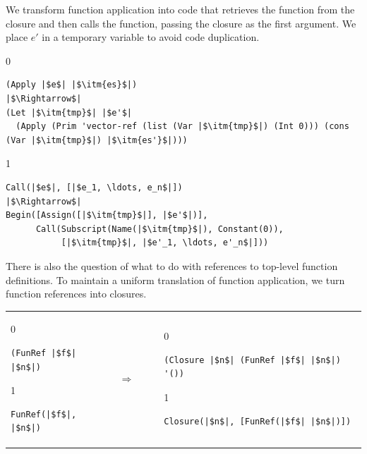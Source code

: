 \documentclass[7x10]{TimesAPriori_MIT}%
\def\racketEd{0}
\def\pythonEd{1}
\def\edition{1}
\newcommand{\pythonColor}[0]{}
\numberwithin{theorem}{chapter}
\numberwithin{definition}{chapter}
\numberwithin{equation}{chapter}
\begin{document}
We transform function application into code that retrieves the
function from the closure and then calls the function, passing the
closure as the first argument. We place $e'$ in a temporary variable
to avoid code duplication.
\begin{center}
\begin{minipage}{\textwidth}
{\if\edition\racketEd
\begin{lstlisting}
(Apply |$e$| |$\itm{es}$|)
|$\Rightarrow$|
(Let |$\itm{tmp}$| |$e'$|
  (Apply (Prim 'vector-ref (list (Var |$\itm{tmp}$|) (Int 0))) (cons (Var |$\itm{tmp}$|) |$\itm{es'}$|)))
\end{lstlisting}
\fi}
%
{\if\edition\pythonEd\pythonColor
\begin{lstlisting}
Call(|$e$|, [|$e_1, \ldots, e_n$|])
|$\Rightarrow$|
Begin([Assign([|$\itm{tmp}$|], |$e'$|)],
      Call(Subscript(Name(|$\itm{tmp}$|), Constant(0)),
           [|$\itm{tmp}$|, |$e'_1, \ldots, e'_n$|]))
\end{lstlisting}
\fi}
\end{minipage}
\end{center}

There is also the question of what to do with references to top-level
function definitions. To maintain a uniform translation of function
application, we turn function references into closures.

\begin{tabular}{lll}
\begin{minipage}{0.2\textwidth}
{\if\edition\racketEd
\begin{lstlisting}
(FunRef |$f$| |$n$|)
\end{lstlisting}
\fi}
{\if\edition\pythonEd\pythonColor
\begin{lstlisting}
FunRef(|$f$|, |$n$|)
\end{lstlisting}
\fi}
\end{minipage}
&
$\Rightarrow\qquad$
&
\begin{minipage}{0.5\textwidth}
{\if\edition\racketEd
\begin{lstlisting}
(Closure |$n$| (FunRef |$f$| |$n$|) '())
\end{lstlisting}
\fi}
{\if\edition\pythonEd\pythonColor
\begin{lstlisting}
Closure(|$n$|, [FunRef(|$f$| |$n$|)])
\end{lstlisting}
\fi}
\end{minipage}
\end{tabular}  \\
\end{document}
